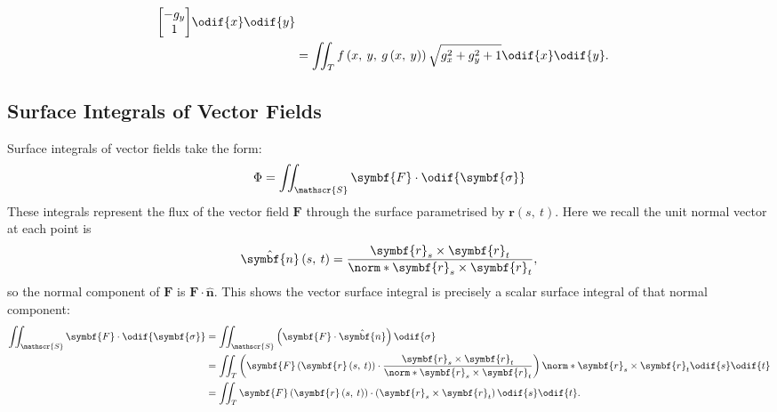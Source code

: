 \documentclass{article}
\begin{document}
\begin{align*}
{\begin{bmatrix}
                                                                                                               -g_y \\
                                                                                                               1
                                                                                                           \end{bmatrix}
                                                                                                       } \odif{x} \odif{y}                                 \\
                                        & = \iint_{T} f\left( x,\: y,\: g\left( x,\: y \right) \right) \sqrt{g_x^2 + g_y^2 + 1} \odif{x} \odif{y}.
\end{align*}
\subsection{Surface Integrals of Vector Fields}
Surface integrals of vector fields take the form:
\begin{equation*}
    \Phi = \iint_{\mathscr{S}} \symbf{F} \cdot \odif{\symbf{\sigma}}
\end{equation*}
These integrals represent the flux of the vector field \(\symbf{F}\)
through the surface parametrised by \(\symbf{r}\left( s,\: t \right)\).
Here we recall the unit normal vector at each point is
\begin{equation*}
    \hat{\symbf{n}}\left( s,\: t \right) = \frac{\symbf{r}_s \times \symbf{r}_t}{\norm*{\symbf{r}_s \times \symbf{r}_t}},
\end{equation*}
so the normal component of \(\symbf{F}\) is \(\symbf{F} \cdot \hat{\symbf{n}}\).
This shows the vector surface integral is precisely a scalar surface
integral of that normal component:
\begin{align*}
    \iint_{\mathscr{S}} \symbf{F} \cdot \odif{\symbf{\sigma}}
     & = \iint_{\mathscr{S}} \left( \symbf{F} \cdot \hat{\symbf{n}} \right) \odif{\sigma}                                                                                                                                            \\
     & = \iint_T \left( \symbf{F}\left( \symbf{r}\left( s,\: t \right) \right) \cdot \frac{\symbf{r}_s \times \symbf{r}_t}{\norm*{\symbf{r}_s \times \symbf{r}_t} } \right) \norm*{\symbf{r}_s \times \symbf{r}_t} \odif{s} \odif{t} \\
     & = \iint_T \symbf{F}\left( \symbf{r}\left( s,\: t \right) \right) \cdot \left( \symbf{r}_s \times \symbf{r}_t \right) \odif{s} \odif{t}.
\end{align*}
\end{document}
